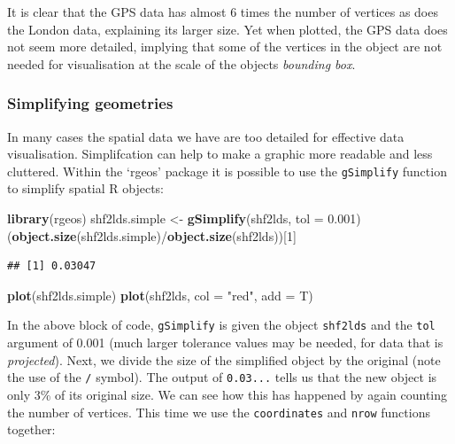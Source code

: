 \documentclass[]{article}
\newenvironment{Shaded}{}{}
\newcommand{\KeywordTok}[1]{\textcolor[rgb]{0.00,0.44,0.13}{\textbf{{#1}}}}
\newcommand{\DataTypeTok}[1]{\textcolor[rgb]{0.56,0.13,0.00}{{#1}}}
\newcommand{\DecValTok}[1]{\textcolor[rgb]{0.25,0.63,0.44}{{#1}}}
\newcommand{\FloatTok}[1]{\textcolor[rgb]{0.25,0.63,0.44}{{#1}}}
\newcommand{\StringTok}[1]{\textcolor[rgb]{0.25,0.44,0.63}{{#1}}}
\newcommand{\NormalTok}[1]{{#1}}
\begin{document}
It is clear that the GPS data has almost 6 times the number of vertices
as does the London data, explaining its larger size. Yet when plotted,
the GPS data does not seem more detailed, implying that some of the
vertices in the object are not needed for visualisation at the scale of
the objects \emph{bounding box}.

\subsubsection{Simplifying geometries}

In many cases the spatial data we have are too detailed for effective
data visualisation. Simplifcation can help to make a graphic more
readable and less cluttered. Within the `rgeos' package it is possible
to use the \texttt{gSimplify} function to simplify spatial R objects:

\begin{Shaded}
\begin{Highlighting}[]
\KeywordTok{library}\NormalTok{(rgeos)}
\NormalTok{shf2lds.simple <- }\KeywordTok{gSimplify}\NormalTok{(shf2lds, }\DataTypeTok{tol =} \FloatTok{0.001}\NormalTok{)}
\NormalTok{(}\KeywordTok{object.size}\NormalTok{(shf2lds.simple)/}\KeywordTok{object.size}\NormalTok{(shf2lds))[}\DecValTok{1}\NormalTok{]}
\end{Highlighting}
\end{Shaded}
\begin{verbatim}
## [1] 0.03047
\end{verbatim}
\begin{Shaded}
\begin{Highlighting}[]
\KeywordTok{plot}\NormalTok{(shf2lds.simple)}
\KeywordTok{plot}\NormalTok{(shf2lds, }\DataTypeTok{col =} \StringTok{"red"}\NormalTok{, }\DataTypeTok{add =} \NormalTok{T)}
\end{Highlighting}
\end{Shaded}
In the above block of code, \texttt{gSimplify} is given the object
\texttt{shf2lds} and the \texttt{tol} argument of 0.001 (much larger
tolerance values may be needed, for data that is \emph{projected}).
Next, we divide the size of the simplified object by the original (note
the use of the \texttt{/} symbol). The output of \texttt{0.03...} tells
us that the new object is only 3\% of its original size. We can see how
this has happened by again counting the number of vertices. This time we
use the \texttt{coordinates} and \texttt{nrow} functions together:
\end{document}
